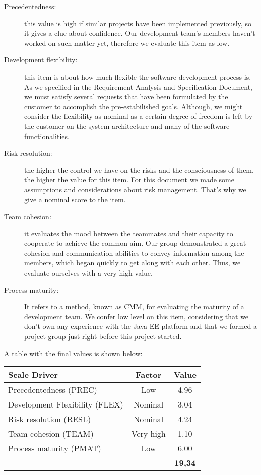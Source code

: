 \begin{description}
\item[Precedentedness:] this value is high if similar projects have been implemented previously, so it gives a clue about confidence. Our development team's members haven't worked on such matter yet, therefore we evaluate this item as low.
\item[Development flexibility:] this item is about how much flexible the software development process is. As we specified in the Requirement Analysis and Specification Document, we must satisfy several requests that have been formulated by the customer to accomplish the pre-estabilished goals. Although, we might consider the flexibility as nominal as a certain degree of freedom is left by the customer on the system architecture and many of the software functionalities.
\item[Risk resolution:] the higher the control we have on the risks and the consciousness of them, the higher the value for this item. For this document we made some assumptions and considerations about risk management. That's why we give a nominal score to the item.
\item[Team cohesion:] it evaluates the mood between the teammates and their capacity to cooperate to achieve the common aim. Our group demonstrated a great cohesion and communication abilities to convey information among the members, which began quickly to get along with each other. Thus, we evaluate ourselves with a very high value.
\item[Process maturity:] It refers to a method, known as CMM, for evaluating the maturity of a development team. We confer low level on this item, considering that we don't own any experience with the Java EE platform and that we formed a project group just right before this project started.
\end{description}
	
A table with the final values is shown below:
\begin{center}
\begin{tabular}{ | l | c | c | }
\hline
	\textbf{Scale Driver} & \textbf{Factor} & \textbf{Value}  \\ \hline\hline
	Precedentedness (PREC)& Low &  4.96 \\ \hline
	Development Flexibility (FLEX) & Nominal & 3.04 \\ \hline
	Risk resolution (RESL) & Nominal & 4.24  \\ \hline
	Team cohesion (TEAM)  & Very high &  1.10  \\ \hline
	Process maturity (PMAT) &  Low & 6.00 \\ \hline
         \multicolumn{1}{|l}{}\textbf{Total} &  & \textbf{19,34} \\ \hline
\end{tabular}
\end{center}

